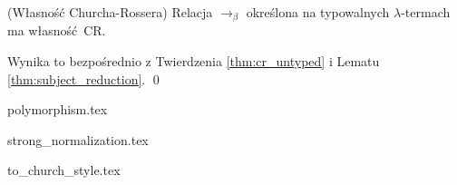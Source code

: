 \begin{twierdzenie}(Własność Churcha-Rossera)
  Relacja \(\to_\beta\) określona na typowalnych \(\lambda\)-termach  ma własność CR.
\end{twierdzenie}
\begin{dowod}
  Wynika to bezpośrednio z Twierdzenia \ref{thm:cr_untyped} i Lematu \ref{thm:subject_reduction}. \qed
\end{dowod}

{polymorphism.tex}

{strong_normalization.tex}

{to_church_style.tex}
